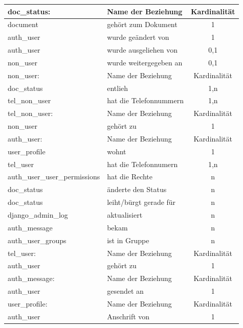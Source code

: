 \begin{longtable}{|p{5cm}||m{5cm}|c|}
  doc\_status: & Name der Beziehung & Kardinalität\\
  \hline\hline
  document & gehört zum Dokument & 1\\
  \hline
  auth\_user & wurde geändert von & 1\\
  \hline
  auth\_user & wurde ausgeliehen von & 0,1\\
  \hline
  non\_user & wurde weitergegeben an & 0,1\\
  \hline\hline\hline
  
  non\_user: & Name der Beziehung & Kardinalität\\
  \hline\hline
  doc\_status & entlieh & 1,n\\
  \hline
  tel\_non\_user & hat die Telefonnummern & 1,n\\
  \hline\hline\hline
  
  tel\_non\_user:  & Name der Beziehung &  Kardinalit\"at\\
  \hline\hline
  non\_user & gehört zu & 1 \\
  \hline\hline\hline
  
  auth\_user: & Name der Beziehung & Kardinalität\\
  \hline\hline
  user\_profile & wohnt & 1\\
  \hline
  tel\_user & hat die Telefonnumern & 1,n\\
  \hline
  auth\_user\_user\_permissions & hat die Rechte & n\\
  \hline
  doc\_status & änderte den Status & n\\  
  \hline
  doc\_status & leiht/bürgt gerade für & n\\
  \hline
  django\_admin\_log & aktualisiert & n\\
  \hline
  auth\_message & bekam & n\\
  \hline
  auth\_user\_groups & ist in Gruppe & n\\
  \hline\hline\hline
  
  tel\_user:  & Name der Beziehung &  Kardinalit\"at\\
  \hline\hline
  auth\_user & gehört zu & 1 \\
  \hline\hline\hline 
  
  auth\_message: & Name der Beziehung &  Kardinalit\"at\\
  \hline\hline
  auth\_user & gesendet an & 1 \\
  \hline\hline\hline 
  
  user\_profile:  & Name der Beziehung &  Kardinalit\"at\\
  \hline\hline
  auth\_user & Anschrift von & 1 \\
  \hline\hline\hline
  

\end{longtable}
